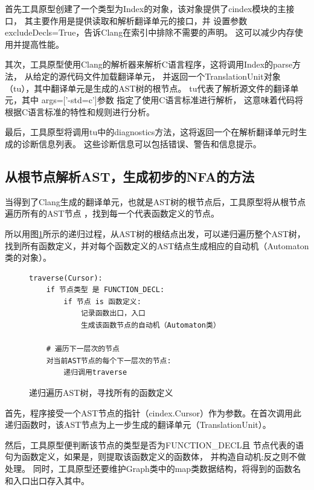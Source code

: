 首先工具原型创建了一个类型为Index的对象，该对象提供了cindex模块的主接口，
其主要作用是提供读取和解析翻译单元的接口，并
设置参数 excludeDecls=True，告诉Clang在索引中排除不需要的声明。
这可以减少内存使用并提高性能。

其次，工具原型使用Clang的解析器来解析C语言程序，这将调用Index的parse方法，
从给定的源代码文件加载翻译单元，
并返回一个TranslationUnit对象（tu），其中翻译单元是生成的AST树的根节点。
tu代表了解析源文件的翻译单元，其中 args=['-std=c']参数
指定了使用C语言标准进行解析，
这意味着代码将根据C语言标准的特性和规则进行分析。

最后，工具原型将调用tu中的diagnostics方法，这将返回一个在解析翻译单元时生成的诊断信息列表。
这些诊断信息可以包括错误、警告和信息提示。

\subsection{从根节点解析AST，生成初步的NFA的方法}
当得到了Clang生成的翻译单元，也就是AST树的根节点后，工具原型将从根节点遍历所有的AST节点
，找到每一个代表函数定义的节点。

所以用图\ref{递归遍历AST树，寻找所有的函数定义}所示的递归过程，从AST树的根结点出发，可以递归遍历整个AST树，找到所有函数定义，并对每个函数定义的AST结点生成相应的自动机（Automaton类的对象）。\\

\begin{figure}[ht]
\centering
\begin{minipage}{10cm}
\begin{lstlisting}
traverse(Cursor):
    if 节点类型 是 FUNCTION_DECL:
        if 节点 is 函数定义:
            记录函数出口，入口
            生成该函数节点的自动机（Automaton类）

    # 遍历下一层次的节点
    对当前AST节点的每个下一层次的节点:
        递归调用traverse

\end{lstlisting}
\end{minipage}
\caption{递归遍历AST树，寻找所有的函数定义}
\label{递归遍历AST树，寻找所有的函数定义}
\end{figure}

首先，程序接受一个AST节点的指针（cindex.Cursor）作为参数。在首次调用此递归函数时，该AST节点为上一步生成的翻译单元（TranslationUnit）。

然后，工具原型便判断该节点的类型是否为FUNCTION\_DECL且
节点代表的语句为函数定义，如果是，则提取该函数定义的函数体，
并构造自动机;反之则不做处理。
同时，工具原型还要维护Graph类中的map类数据结构，将得到的函数名和入口出口存入其中。

